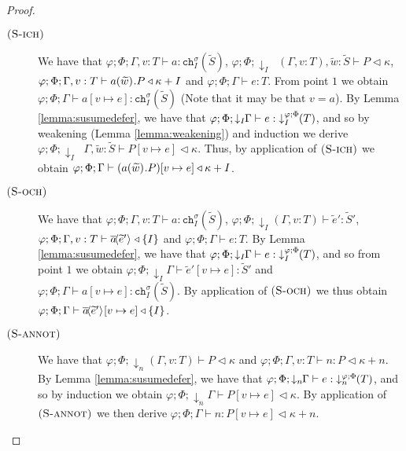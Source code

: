 \begin{lemma}[Substitution]
\begin{proof}
\begin{enumerate}
\begin{description}
\item[$\runa{S-ich}$] We have that $\varphi;\Phi;\Gamma,v:T\vdash a : \texttt{ch}^\sigma_I(\widetilde{S})$, $\varphi;\Phi;\downarrow_I\;\;(\Gamma,v:T),\widetilde{w}:\widetilde{S}\vdash P \triangleleft \kappa$, $\varphi;\Phi;\Gamma,v:T\vdash \inputch{a}{\widetilde{w}}{}{P} \triangleleft \kappa + I$ and $\varphi;\Phi;\Gamma\vdash e : T$. From point $1$ we obtain $\varphi;\Phi;\Gamma\vdash a[v\mapsto e] : \texttt{ch}^\sigma_I(\widetilde{S})$ (Note that it may be that $v=a$). By Lemma \ref{lemma:susumedefer}, we have that $\varphi;\Phi;\downarrow_I\!\!\Gamma\vdash e :\; \susume{T}{\varphi}{\Phi}{I}$, and so by weakening (Lemma \ref{lemma:weakening}) and induction we derive $\varphi;\Phi;\downarrow_I\;\;\Gamma,\widetilde{w}:\widetilde{S}\vdash P[v\mapsto e] \triangleleft \kappa$. Thus, by application of $\runa{S-ich}$ we obtain $\varphi;\Phi;\Gamma\vdash (\inputch{a}{\widetilde{w}}{}{P})[v\mapsto e] \triangleleft \kappa + I$. 
%
\item[$\runa{S-och}$] We have that $\varphi;\Phi;\Gamma,v:T\vdash a : \texttt{ch}^\sigma_I(\widetilde{S})$, $\varphi;\Phi;\downarrow_I\!\!(\Gamma,v:T)\vdash \widetilde{e}' : \widetilde{S}'$, $\varphi;\Phi;\Gamma,v:T\vdash \asyncoutputch{a}{\widetilde{e}'}{} \triangleleft \{I\}$ and $\varphi;\Phi;\Gamma\vdash e : T$. By Lemma \ref{lemma:susumedefer}, we have that $\varphi;\Phi;\downarrow_I\!\!\Gamma\vdash e :\; \susume{T}{\varphi}{\Phi}{I}$, and so from point $1$ we obtain $\varphi;\Phi;\downarrow_I\!\!\Gamma\vdash \widetilde{e}'[v\mapsto e] : \widetilde{S}'$ and $\varphi;\Phi;\Gamma\vdash a[v\mapsto e] : \texttt{ch}^\sigma_I(\widetilde{S})$. By application of $\runa{S-och}$ we thus obtain $\varphi;\Phi;\Gamma\vdash \asyncoutputch{a}{\widetilde{e}'}{}[v\mapsto e] \triangleleft \{I\}$.
%
\item[$\runa{S-annot}$] We have that $\varphi;\Phi;\downarrow_n\!\!(\Gamma,v:T)\vdash P \triangleleft \kappa$ and $\varphi;\Phi;\Gamma,v:T\vdash n : P \triangleleft \kappa + n$. By Lemma \ref{lemma:susumedefer}, we have that $\varphi;\Phi;\downarrow_n\!\!\Gamma\vdash e :\; \susume{T}{\varphi}{\Phi}{n}$, and so by induction we obtain $\varphi;\Phi;\downarrow_n\!\!\Gamma\vdash P[v\mapsto e] \triangleleft \kappa$. By application of $\runa{S-annot}$ we then derive $\varphi;\Phi;\Gamma\vdash n : P[v\mapsto e] \triangleleft \kappa + n$.
%

\end{description}
\end{enumerate}
\end{proof}
\end{lemma}
